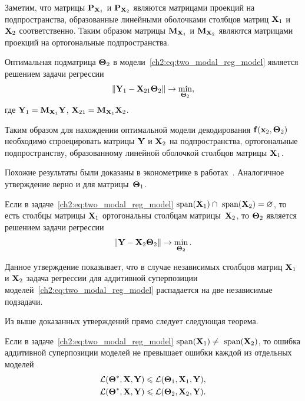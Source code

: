 \documentclass[11pt, a5paper]{dissert}
\begin{document}
Заметим, что матрицы $\mathbf{P}_{\mathbf{X}_1}$ и $\mathbf{P}_{\mathbf{X}_2}$ являются матрицами проекций на подпространства, образованные линейными оболочками столбцов матриц $\mathbf{X}_1$ и $\mathbf{X}_2$ соответственно.
Таким образом матрицы $\mathbf{M}_{\mathbf{X}_1}$ и $\mathbf{M}_{\mathbf{X}_2}$ являются матрицами проекций на ортогональные подпространства.

\begin{statement}
	\label{ch2:stat:two_modal_theta2}
	Оптимальная подматрица $\boldsymbol{\Theta}_2$ в модели~\eqref{ch2:eq:two_modal_reg_model} является решением задачи регрессии
	\begin{equation}
		\| \mathbf{Y}_1 -  \mathbf{X}_{21} \boldsymbol{\Theta}_2 \| \rightarrow \min_{\boldsymbol{\Theta}_2},
		\label{ch2:eq:two_modal_fwl}
	\end{equation}
	где $\mathbf{Y}_1 = \mathbf{M}_{\mathbf{X}_1} \mathbf{Y}$, $\mathbf{X}_{21} = \mathbf{M}_{\mathbf{X}_1} \mathbf{X}_2$.
\end{statement}

Таким образом для нахождении оптимальной модели декодирования $\mathbf{f}(\mathbf{x}_2, \boldsymbol{\Theta}_2)$ необходимо спроецировать матрицы $\mathbf{Y}$ и $\mathbf{X}_2$ на подпространства, ортогональные подпространству, образованному линейной оболочкой столбцов матрицы $\mathbf{X}_1$.

Похожие результаты были доказаны в эконометрике в работах~\cite{frisch1933partial,lovell1963seasonal,cinelli2020making}. Аналогичное утверждение верно и для матрицы~$\boldsymbol{\Theta}_1$. 

\begin{statement}
	Если в задаче~\eqref{ch2:eq:two_modal_reg_model} $\text{span}(\mathbf{X}_1) \cap \text{ span}(\mathbf{X}_2) = \varnothing$, то есть столбцы матрицы $\mathbf{X}_1$ ортогональны столбцам матрицы~$\mathbf{X}_2$, то $\boldsymbol{\Theta}_2$ является решением задачи регрессии
	\[
		\| \mathbf{Y} -  \mathbf{X}_{2} \boldsymbol{\Theta}_2 \| \rightarrow \min_{\boldsymbol{\Theta}_2}.
	\]
\end{statement}

Данное утверждение показывает, что в случае независимых столбцов матриц $\mathbf{X}_1$ и $\mathbf{X}_2$ задача регрессии для аддитивной суперпозиции моделей~\eqref{ch2:eq:two_modal_reg_model} распадается на две независимые подзадачи.

Из выше доказанных утверждений прямо следует следующая теорема.

\begin{theorem}
	Если в задаче~\eqref{ch2:eq:two_modal_reg_model} $\text{span}(\mathbf{X}_1) \neq \text{ span}(\mathbf{X}_2)$, то ошибка аддитивной суперпозиции моделей не превышает ошибки каждой из отдельных моделей
	\begin{align*}
		\mathcal{L}(\boldsymbol{\Theta}^*, \mathbf{X}, \mathbf{Y}) &\leqslant \mathcal{L}(\boldsymbol{\Theta}_1, \mathbf{X}_1, \mathbf{Y}), \\
		\mathcal{L}(\boldsymbol{\Theta}^*, \mathbf{X}, \mathbf{Y}) &\leqslant \mathcal{L}(\boldsymbol{\Theta}_2, \mathbf{X}_2, \mathbf{Y}).
	\end{align*}
\end{theorem}
\end{document}

